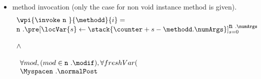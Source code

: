 \begin{itemize}
\begin{enumerate}
	\end{enumerate}
	 		\item method invocation  (only the case for non void instance method is given). 
	 				 			$$\begin{array}{l}
								 \wpi{\invoke  \   \mbox{\rm\texttt{n} } } {\methodd}{i}  =   \\
	 				 	 \mbox{\rm\texttt{n} } .\pre[ \locVar{s} \leftarrow \stack{\counter + s -\methodd.\numArgs}]_{s = 0}^{ \mbox{\rm\texttt{n} }  .\numArgs }  \\ \\
	 				 			\wedge \\\\
								\begin{array}{l}
	 				 			       \forall  mod ,  ( mod \in \mbox{\rm\texttt{n} } .\modif ), \forall freshVar (  \\ 
	 				 				              \Myspace \mbox{\rm\texttt{n} } .\normalPost \begin{array}{l}

\end{array}
\end{array}
\end{array}$$
\end{itemize}
